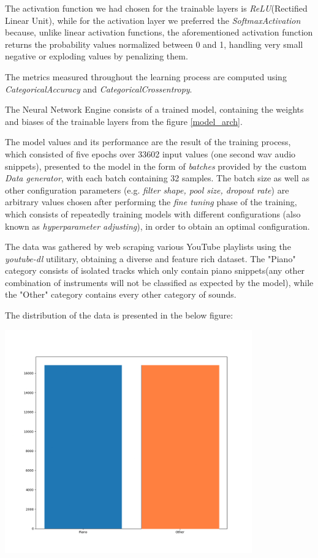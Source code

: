 The activation function we had chosen for the trainable layers is \textit{ReLU}(Rectified Linear Unit), while for
the activation layer we preferred the \textit{SoftmaxActivation} because, unlike linear activation functions,
the aforementioned activation function returns the probability values normalized between 0 and 1, handling
very small negative or exploding values by penalizing them.


The metrics measured throughout the learning process are computed using \textit{CategoricalAccuracy} and
\textit{CategoricalCrossentropy}.




The Neural Network Engine consists of a trained model, containing the weights and biases of the trainable layers from
the figure \ref{model_arch}.

The model values and its performance are the result of the training process, which consisted of five epochs over 33602
input values (one second wav audio snippets), presented to the model in the form of \textit{batches} provided
by the custom \textit{Data generator}, with each batch containing 32 samples. The batch size as well as other
configuration parameters (e.g. \textit{filter shape, pool size, dropout rate}) are arbitrary values chosen
after performing the \textit{fine tuning} phase of the training, which consists of repeatedly training models with
different configurations (also known as \textit{hyperparameter adjusting}), in order to obtain an optimal configuration.


The data was gathered by web scraping various YouTube playlists using the \textit{youtube-dl} utilitary, obtaining a
diverse and feature rich dataset.
The "Piano" category consists of isolated tracks which only contain piano snippets(any other combination of instruments
will not be classified as expected by the model), while the "Other" category contains every other category of sounds.

The distribution of the data is presented in the below figure:

\begin{center}
	\includegraphics[width = 4.2in]{images/datadistr.png}
	\centerline{}
\label{dd}
\end{center}

